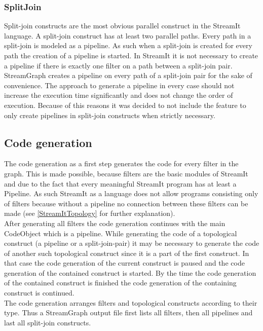 \documentclass[journal]{IEEEtran}
\begin{document}
\subsubsection{SplitJoin}
\noindent Split-join constructs are the most obvious parallel construct in the
StreamIt language. A split-join construct has at least two parallel paths. Every
path in a split-join is modeled as a pipeline. As such when a split-join is
created for every path the creation of a pipeline is started. In StreamIt it is
not necessary to create a pipeline if there is exactly one filter on a path
between a split-join pair. StreamGraph creates a pipeline on every path of a
split-join pair for the sake of convenience. The approach to generate a
pipeline in every case should not increase the execution time significantly and
does not change the order of execution. Because of this reasons it was decided
to not include the feature to only create pipelines in split-join constructs 
when strictly necessary.\\



\subsection{Code generation}
\noindent The code generation as a first step generates the code for every
filter in the graph. This is made possible, because filters are the basic
modules of StreamIt and due to the fact that every meaningful StreamIt program
has at least a Pipeline.  As such StreamIt as a language does not allow programs
consisting only of filters because without a pipeline no connection between
these filters can be made (see \ref{StreamItTopology} for further
explanation).\\
After generating all filters the code generation continues with the main
CodeObject which is a pipeline. While generating the code of a topological
construct (a pipeline or a split-join-pair) it may be necessary to generate the
code of another such topological construct since it is a part of the first
construct. In that case the code generation of the current construct is paused
and the code generation of the contained construct is started. By the time the
code generation of the contained construct is finished the code generation of
the containing construct is continued.\\
The code generation arranges filters and topological constructs according to
their type. Thus a StreamGraph output file first lists all filters, then all
pipelines and last all split-join constructs.\\
\end{document}
